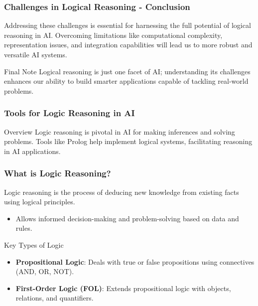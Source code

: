 \documentclass[aspectratio=169]{beamer}
\begin{document}
\begin{frame}[fragile]
    \frametitle{Challenges in Logical Reasoning - Conclusion}
    Addressing these challenges is essential for harnessing the full potential of logical reasoning in AI. Overcoming limitations like computational complexity, representation issues, and integration capabilities will lead us to more robust and versatile AI systems.

    \begin{block}{Final Note}
        Logical reasoning is just one facet of AI; understanding its challenges enhances our ability to build smarter applications capable of tackling real-world problems.
    \end{block}
\end{frame}

\begin{frame}
    \frametitle{Tools for Logic Reasoning in AI}
    \begin{block}{Overview}
        Logic reasoning is pivotal in AI for making inferences and solving problems. 
        Tools like Prolog help implement logical systems, facilitating reasoning in AI applications.
    \end{block}
\end{frame}

\begin{frame}
    \frametitle{What is Logic Reasoning?}
    Logic reasoning is the process of deducing new knowledge from existing facts using logical principles.
    
    \begin{itemize}
        \item Allows informed decision-making and problem-solving based on data and rules.
    \end{itemize}
    
    \begin{block}{Key Types of Logic}
        \begin{itemize}
            \item \textbf{Propositional Logic}: Deals with true or false propositions using connectives (AND, OR, NOT).
            \item \textbf{First-Order Logic (FOL)}: Extends propositional logic with objects, relations, and quantifiers.
        \end{itemize}
    \end{block}
\end{frame}
\end{document}
